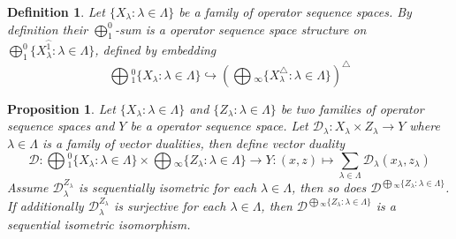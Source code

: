 \documentclass[12pt]{article}
\newtheorem{proposition}[theorem]{Proposition}
\newtheorem{definition}[theorem]{Definition}
\begin{document}
\begin{definition}\label{DefSQCoProd}
Let $\{X_\lambda: \lambda \in \Lambda\}$ be a family of operator sequence spaces. By definition their $\bigoplus_1^0$-sum is a operator sequence space structure on  
$\bigoplus_1^0\{X_\lambda^{\wideparen{1}}:\lambda\in \Lambda\}$, defined by embedding
$$
\bigoplus{}_1^0\{X_\lambda:\lambda \in \Lambda\}\hookrightarrow
\left(\bigoplus{}_\infty\{X_\lambda^\triangle:\lambda\in \Lambda\}\right)^\triangle
$$
\end{definition}

\begin{proposition}\label{PrVectDualCoProdComp} Let $\{X_\lambda:\lambda\in\Lambda\}$ and $\{Z_\lambda:\lambda\in\Lambda\}$ be two families of operator sequence spaces and $Y$ be a operator sequence space. Let $\mathcal{D}_\lambda: X_\lambda\times Z_\lambda\to Y$ where $\lambda\in\Lambda$ is a family of vector dualities, then define vector duality
$$
\mathcal{D}:\bigoplus{}_1^0\{X_\lambda:\lambda\in\Lambda\}\times\bigoplus{}_\infty\{Z_\lambda:\lambda\in\Lambda\}\to Y:(x,z)\mapsto\sum\limits_{\lambda\in\Lambda}\mathcal{D}_\lambda(x_\lambda,z_\lambda)
$$
Assume $\mathcal{D}_\lambda^{Z_\lambda}$ is sequentially isometric for each $\lambda\in\Lambda$, then so does $\mathcal{D}^{\bigoplus{}_\infty\{Z_\lambda:\lambda\in\Lambda\}}$. If additionally $\mathcal{D}_\lambda^{Z_\lambda}$ is surjective for each $\lambda\in\Lambda$, then $\mathcal{D}^{\bigoplus{}_\infty\{Z_\lambda:\lambda\in\Lambda\}}$ is a sequential isometric isomorphism.
\end{proposition}
\end{document}
